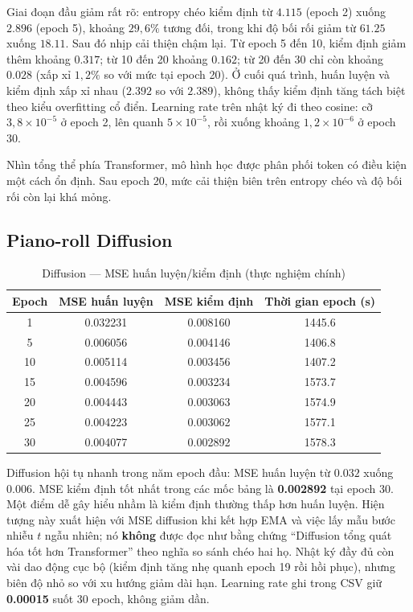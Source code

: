 Giai đoạn đầu giảm rất rõ: entropy chéo kiểm định từ $4.115$ (epoch 2) xuống $2.896$ (epoch 5), khoảng $29{,}6\%$ tương đối, trong khi độ bối rối giảm từ $61.25$ xuống $18.11$. Sau đó nhịp cải thiện chậm lại. Từ epoch 5 đến 10, kiểm định giảm thêm khoảng $0.317$; từ 10 đến 20 khoảng $0.162$; từ 20 đến 30 chỉ còn khoảng $0.028$ (xấp xỉ $1{,}2\%$ so với mức tại epoch 20). Ở cuối quá trình, huấn luyện và kiểm định xấp xỉ nhau ($2.392$ so với $2.389$), không thấy kiểm định tăng tách biệt theo kiểu overfitting cổ điển. Learning rate trên nhật ký đi theo cosine: cỡ $3{,}8\times 10^{-5}$ ở epoch 2, lên quanh $5\times 10^{-5}$, rồi xuống khoảng $1{,}2\times 10^{-6}$ ở epoch 30.

Nhìn tổng thể phía Transformer, mô hình học được phân phối token có điều kiện một cách ổn định. Sau epoch 20, mức cải thiện biên trên entropy chéo và độ bối rối còn lại khá mỏng.

\subsection{Piano-roll Diffusion}

\begin{table}[htbp]
\centering
\caption{Diffusion --- MSE huấn luyện/kiểm định (thực nghiệm chính)}
\label{tab:ch4-diff-loss}
\begin{tabular}{cccc}
\toprule
Epoch & MSE huấn luyện & MSE kiểm định & Thời gian epoch (s) \\
\midrule
1 & 0.032231 & 0.008160 & 1445.6 \\
5 & 0.006056 & 0.004146 & 1406.8 \\
10 & 0.005114 & 0.003456 & 1407.2 \\
15 & 0.004596 & 0.003234 & 1573.7 \\
20 & 0.004443 & 0.003063 & 1574.9 \\
25 & 0.004223 & 0.003062 & 1577.1 \\
30 & 0.004077 & 0.002892 & 1578.3 \\
\bottomrule
\end{tabular}
\end{table}

Diffusion hội tụ nhanh trong năm epoch đầu: MSE huấn luyện từ $0.032$ xuống $0.006$. MSE kiểm định tốt nhất trong các mốc bảng là \textbf{0.002892} tại epoch 30. Một điểm dễ gây hiểu nhầm là kiểm định thường thấp hơn huấn luyện. Hiện tượng này xuất hiện với MSE diffusion khi kết hợp EMA và việc lấy mẫu bước nhiễu $t$ ngẫu nhiên; nó \textbf{không} được đọc như bằng chứng ``Diffusion tổng quát hóa tốt hơn Transformer'' theo nghĩa so sánh chéo hai họ. Nhật ký đầy đủ còn vài dao động cục bộ (kiểm định tăng nhẹ quanh epoch 19 rồi hồi phục), nhưng biên độ nhỏ so với xu hướng giảm dài hạn. Learning rate ghi trong CSV giữ \textbf{0.00015} suốt 30 epoch, không giảm dần.

